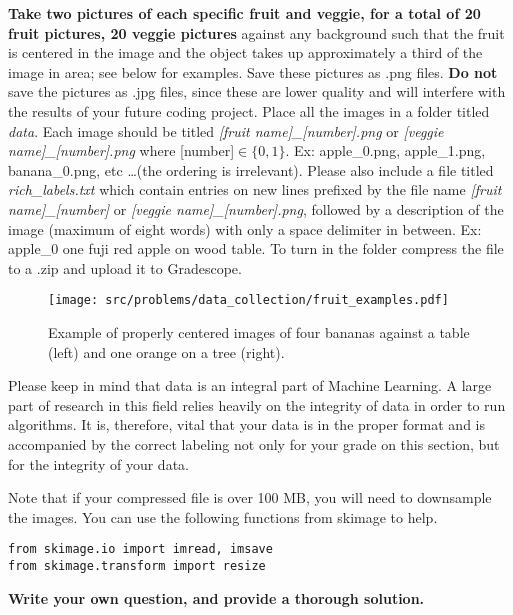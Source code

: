 \documentclass[preview]{standalone}
\begin{document}
{\bf Take two pictures of each specific fruit and veggie, for a total of 20 fruit pictures, 20 veggie pictures} against any background such that the fruit is centered in the image and the object takes up approximately a third of the image in area; see below for examples. Save these pictures as .png files. {\bf Do not} save the pictures as .jpg files, since these are lower quality and will interfere with the results of your future coding project. Place all the images in a folder titled \emph{data}. Each image should be titled \emph{[fruit name]\_[number].png} or  \emph{[veggie name]\_[number].png}  where [number]$\in \{0, 1\}$. Ex: apple\_0.png, apple\_1.png, banana\_0.png, etc \ldots (the ordering is irrelevant). Please also include a file titled \emph{rich\_labels.txt} which contain entries on new lines prefixed by the file name \emph{[fruit name]\_[number]} or  \emph{[veggie name]\_[number].png}, followed by a description of the image (maximum of eight words) with only a space delimiter in between. Ex: apple\_0 one fuji red apple on wood table. To turn in the folder compress the file to a .zip and upload it to Gradescope.


\begin{figure}[h!]
    \begin{center}
    \texttt{[image: src/problems/data\_collection/fruit\_examples.pdf]}
    \caption{Example of properly centered images of four bananas against a table (left) and one orange on a tree (right).} \label{fig:robot}
    \end{center}
\end{figure}

Please keep in mind that data is an integral part of Machine Learning. A large part of research in this field relies heavily on the integrity of data in order to run algorithms. It is, therefore, vital that your data is in the proper format and is accompanied by the correct labeling not only for your grade on this section, but for the integrity of your data.

Note that if your compressed file is over 100 MB, you will need to downsample the images. You can use the following functions from skimage to help. 
\begin{lstlisting}
from skimage.io import imread, imsave
from skimage.transform import resize
\end{lstlisting}


{\bf Write your own question, and provide a thorough solution.}
\end{document}
